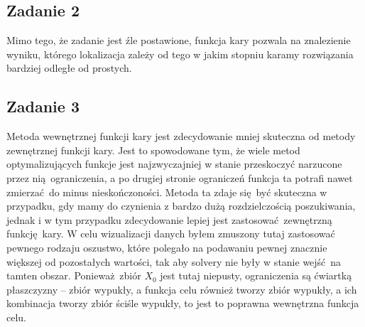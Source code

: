 \documentclass[a4paper, 12pt]{article}
\begin{document}
        \subsection{Zadanie 2}
            Mimo tego, że zadanie jest źle postawione, funkcja kary pozwala na znalezienie wyniku,
            którego lokalizacja zależy od tego w jakim stopniu karamy rozwiązania bardziej odległe od
            prostych.
        \subsection{Zadanie 3}
            Metoda wewnętrznej funkcji kary jest zdecydowanie mniej skuteczna od metody zewnętrznej
            funkcji kary. Jest to spowodowane tym, że wiele metod optymalizujących funkcje jest 
            najzwyczajniej w stanie przeskoczyć narzucone przez nią ograniczenia, a po drugiej
            stronie ograniczeń funkcja ta potrafi nawet zmierzać do minus nieskończoności. Metoda ta
            zdaje się być skuteczna w przypadku, gdy mamy do czynienia z bardzo dużą rozdzielczością 
            poszukiwania, jednak i w tym przypadku zdecydowanie lepiej jest zastosować zewnętrzną
            funkcję kary. W celu wizualizacji danych byłem zmuszony tutaj zastosować pewnego rodzaju
            oszustwo, które polegało na podawaniu pewnej znacznie większej od pozostałych wartości,
            tak aby solvery nie były w stanie wejść na tamten obszar. Ponieważ zbiór $X_0$ jest tutaj
            niepusty, ograniczenia są ćwiartką płaszczyzny -- zbiór wypukły, a funkcja celu również 
            tworzy zbiór wypukły, a ich kombinacja tworzy zbiór ściśle wypukły, to jest to poprawna
            wewnętrzna funkcja celu. 
\end{document}
